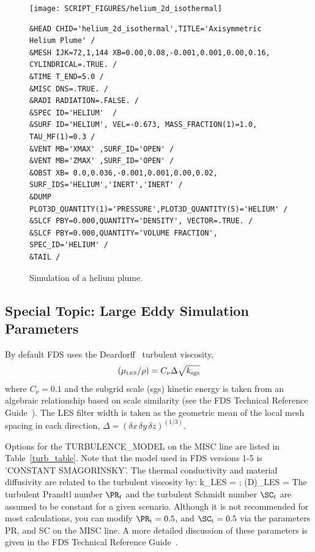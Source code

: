 \documentclass[11pt]{book}
\begin{document}
\begin{figure}[ht]
\noindent
\begin{minipage}{1.1in}
\texttt{[image: SCRIPT\_FIGURES/helium\_2d\_isothermal]}
\end{minipage}
\hfill
\begin{minipage}{5.5in}
\begin{lstlisting}[basicstyle=\scriptsize\ttfamily]
&HEAD CHID='helium_2d_isothermal',TITLE='Axisymmetric Helium Plume' /
&MESH IJK=72,1,144 XB=0.00,0.08,-0.001,0.001,0.00,0.16, CYLINDRICAL=.TRUE. /
&TIME T_END=5.0 /
&MISC DNS=.TRUE. /
&RADI RADIATION=.FALSE. /
&SPEC ID='HELIUM'  /
&SURF ID='HELIUM', VEL=-0.673, MASS_FRACTION(1)=1.0, TAU_MF(1)=0.3 /
&VENT MB='XMAX' ,SURF_ID='OPEN' /
&VENT MB='ZMAX' ,SURF_ID='OPEN' /
&OBST XB= 0.0,0.036,-0.001,0.001,0.00,0.02, SURF_IDS='HELIUM','INERT','INERT' /
&DUMP PLOT3D_QUANTITY(1)='PRESSURE',PLOT3D_QUANTITY(5)='HELIUM' /
&SLCF PBY=0.000,QUANTITY='DENSITY', VECTOR=.TRUE. /
&SLCF PBY=0.000,QUANTITY='VOLUME FRACTION', SPEC_ID='HELIUM' /
&TAIL /
\end{lstlisting}
\end{minipage}
\caption[Snapshot of the {\ct helium\_2d\_isothermal} test case]{Simulation of a helium plume.}
\label{helium_plume}
\end{figure}

\subsection{Special Topic: Large Eddy Simulation Parameters}
\label{info:LES}

By default FDS uses the Deardorff~\cite{Deardorff:1980,Pope:2000} turbulent viscosity,
\begin{equation}
(\mu_{\hbox{\tiny LES}}/\rho) = C_\nu \Delta \sqrt{k_{\rm sgs}}
\end{equation}
where $C_\nu=0.1$ and the subgrid scale (sgs) kinetic energy is taken from an algebraic relationship based on scale similarity (see the FDS Technical Reference Guide~\cite{FDS_Math_Guide}). The LES filter width is taken as the geometric mean of the local mesh spacing in each direction, $\Delta = (\delta x\, \delta y\, \delta z)^{(1/3)}$.

Options for the {\ct TURBULENCE\_MODEL} on the {\ct MISC} line are listed in Table~\ref{turb_table}. Note that the model used in FDS versions 1-5 is {\ct 'CONSTANT SMAGORINSKY'}. The thermal conductivity and material diffusivity are related to the turbulent viscosity by:
\be
   k_{\hbox{\tiny LES}} = 
   \quad ; \quad  (\rho D)_{\hbox{\tiny LES}} =
\ee
The turbulent Prandtl number $\PR_t$ and the turbulent Schmidt number $\SC_t$ are assumed to be constant for a given scenario. Although it is not recommended for most calculations, you can modify $\PR_{\rm t}=0.5$, and $\SC_{\rm t}=0.5$ via the parameters {\ct PR}, and {\ct SC} on the {\ct MISC} line. A more detailed discussion of these parameters is given in the FDS Technical Reference Guide~\cite{FDS_Math_Guide}.
\end{document}
